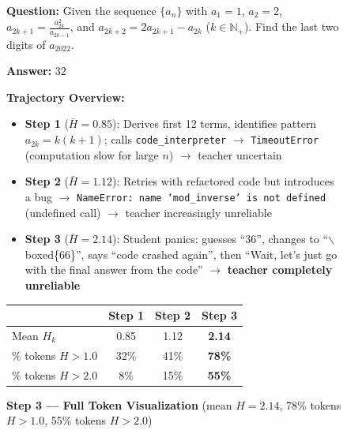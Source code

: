 \begin{figure}[p]
\begin{tcolorbox}
\noindent\textbf{Question:} {\small Given the sequence $\{a_n\}$ with $a_1{=}1$, $a_2{=}2$, $a_{2k+1}{=}\frac{a_{2k}^2}{a_{2k-1}}$, and $a_{2k+2}{=}2a_{2k+1}{-}a_{2k}$ ($k \in \mathbb{N}_+$). Find the last two digits of $a_{2022}$.}

\smallskip
\noindent\textbf{Answer:} $\boxed{32}$ 

\medskip
\noindent\textbf{Trajectory Overview:}
\begin{itemize}[leftmargin=*, nosep, itemsep=2pt]
\item \textbf{Step 1} ($\bar{H}{=}0.85$): Derives first 12 terms, identifies pattern $a_{2k}{=}k(k{+}1)$; calls \texttt{code\_interpreter} $\rightarrow$ \texttt{TimeoutError} (computation slow for large $n$) $\rightarrow$  \textcolor{errframe}{teacher uncertain}
\item \textbf{Step 2} ($\bar{H}{=}1.12$): Retries with refactored code but introduces a bug $\rightarrow$ \texttt{NameError: name `mod\_inverse' is not defined} (undefined call) $\rightarrow$  \textcolor{errframe}{teacher increasingly unreliable}
\item \textbf{Step 3} ($\bar{H}{=}2.14$): Student panics: guesses ``36'', changes to ``$\backslash$boxed\{66\}'', says ``code crashed again'', then ``Wait, let's just go with the final answer from the code'' $\rightarrow$  \textcolor{errframe}{\textbf{teacher completely unreliable}}
\end{itemize}

\medskip
\noindent
\begin{minipage}{\linewidth}
\centering
\footnotesize
\begin{tabular}{lccc}
\toprule
 & Step 1 & Step 2 & \textbf{Step 3} \\
\midrule
Mean $H_k$ & 0.85 & 1.12 & \textbf{2.14} \\
\% tokens $H{>}1.0$ & 32\% & 41\% & \textbf{78\%} \\
\% tokens $H{>}2.0$ & 8\% & 15\% & \textbf{55\%} \\
\bottomrule
\end{tabular}
\end{minipage}

\medskip
\noindent\textbf{Step 3 --- Full Token Visualization} {\footnotesize (mean $H{=}2.14$, 78\% tokens $H{>}1.0$, 55\% tokens $H{>}2.0$)}


\end{tcolorbox}
\end{figure}
